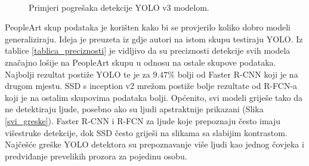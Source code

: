 \begin{figure}[H]
 \
\caption{Primjeri pogrešaka detekcije YOLO v3 modelom.}
\label{yolo_greske}
\end{figure}


PeopleArt skup podataka je korišten kako bi se provjerilo koliko dobro modeli generaliziraju. Ideja je preuzeta iz \cite{DBLP:journals/corr/RedmonDGF15} gdje autori na istom skupu testiraju YOLO. Iz tablice \ref{tablica_preciznosti} je vidljivo da su preciznosti detekcije svih modela značajno lošije na PeopleArt skupu u odnosu na ostale skupove podataka. Najbolji rezultat postiže YOLO te je za $9.47\%$ bolji od Faster R-CNN koji je na drugom mjestu. SSD s inception v2 mrežom postiže bolje rezultate od R-FCN-a koji je na ostalim skupovima podataka bolji.
Općenito, svi modeli griješe tako da ne detektiraju ljude, posebno ako su ljudi apstraktnije prikazani (Slika \ref{svi_greske}). Faster R-CNN i R-FCN za ljude koje prepoznaju često imaju višestruke detekcije, dok SSD često griješi na slikama sa slabijim kontrastom. Najčešće greške YOLO detektora su prepoznavanje više ljudi kao jednog čovjeka i predviđanje prevelikih prozora za pojedinu osobu.


